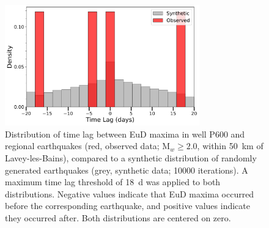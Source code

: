\begin{figure}[H]
    \centering
    \includegraphics[width=0.75\textwidth]{chapters/06_appendix/SI_C3/distribution_earthquakes_wo_outliers_well_600.pdf}
    \caption{
    Distribution of time lag between EuD maxima in well P600 and regional earthquakes (red, observed data; M$_w \geq 2.0$, within \SI{50}{\kilo\meter} of Lavey-les-Bains), compared to a synthetic distribution of randomly generated earthquakes (grey, synthetic data; \num{10000} iterations).
    A maximum time lag threshold of \SI{18}{\day} was applied to both distributions.
    Negative values indicate that EuD maxima occurred before the corresponding earthquake, and positive values indicate they occurred after.
    Both distributions are centered on zero.
    }
    \label{figSI:distributions_P600}
\end{figure}